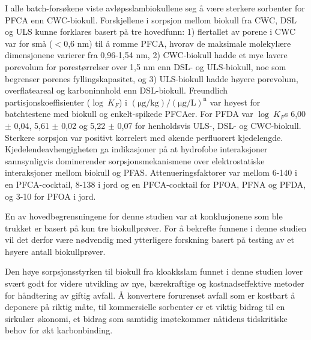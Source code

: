 I alle batch-forsøkene viste avløpsslambiokullene seg å være sterkere sorbenter for PFCA enn CWC-biokull. Forskjellene i sorpsjon mellom biokull fra CWC, DSL og ULS kunne forklares basert på tre hovedfunn: 1) flertallet av porene i CWC var for små ($<$0,6 nm) til å romme PFCA, hvorav de maksimale molekylære dimensjonene varierer fra 0,96-1,54 nm, 2) CWC-biokull hadde et mye lavere porevolum for porestørrelser over 1,5 nm enn DSL- og ULS-biokull, noe som begrenser porenes fyllingskapasitet, og 3) ULS-biokull hadde høyere porevolum, overflateareal og karboninnhold enn DSL-biokull. Freundlich partisjonskoeffisienter ($\log~K_F$) i $\mathrm{(\mu g/kg)/(\mu g/L)^n}$ var høyest for batchtestene med biokull og enkelt-spikede PFCAer. For PFDA var $\log~K_F$s 6,00 $\pm$ 0,04, 5,61 $\pm$ 0,02 og 5,22 $\pm$ 0,07 for henholdsvis ULS-, DSL- og CWC-biokull. Sterkere sorpsjon var positivt korrelert med økende perfluorert kjedelengde. Kjedelendeavhengigheten ga indikasjoner på at hydrofobe interaksjoner sannsynligvis dominerender sorpsjonsmekanismene over elektrostatiske interaksjoner mellom biokull og PFAS. Attenueringsfaktorer var mellom 6-140 i en PFCA-cocktail, 8-138 i jord og en PFCA-cocktail for PFOA, PFNA og PFDA, og 3-10 for PFOA i jord.

En av hovedbegrensningene for denne studien var at konklusjonene som ble trukket er basert på kun tre biokullprøver. For å bekrefte funnene i denne studien vil det derfor være nødvendig med ytterligere forskning basert på testing av et høyere antall biokullprøver. 

Den høye sorpsjonsstyrken til biokull fra kloakkslam funnet i denne studien lover svært godt for videre utvikling av nye, bærekraftige og kostnadseffektive metoder for håndtering av giftig avfall. Å konvertere forurenset avfall som er kostbart å deponere på riktig måte, til kommersielle sorbenter er et viktig bidrag til en sirkulær økonomi, et bidrag som samtidig imøtekommer nåtidens tidskritiske behov for økt karbonbinding.


